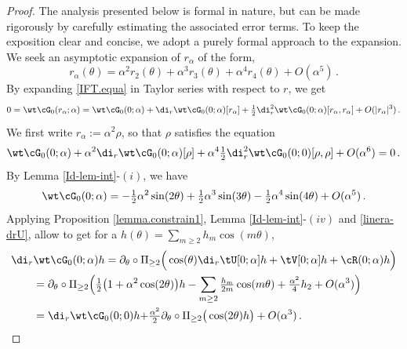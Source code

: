 \documentclass[a4paper,reqno,10pt]{article}
\newcommand{\pa}{\partial}
\begin{document}
\begin{proof}
    The analysis presented below is formal in nature, but can be made rigorously by carefully estimating the associated error terms. To keep the exposition clear and concise, we adopt a purely formal approach to the expansion. We seek an asymptotic expansion of \( r_\alpha \) of the form,
	\begin{equation}\label{ansatz.ralpha}
		r_\alpha(\theta) = \alpha^2 r_2(\theta)  + \alpha^3 r_3(\theta) + \alpha^4 r_4(\theta) + O(\alpha^5) \,.
	\end{equation}
	By expanding \eqref{IFT.equa} in Taylor series with respect to $r$, we get
	\begin{equation}
		0 = \wt\cG_{0}(r_\alpha;\alpha) = \wt\cG_{0}(0;\alpha) + \di_{r} \wt\cG_{0}(0;\alpha) [r_{\alpha}] + \tfrac12 \di_{r}^2 \wt\cG_{0}(0;\alpha) [r_\alpha,r_\alpha] + O(|r_\alpha|^3) \,.
	\end{equation}
    We first write $r_\alpha:=\alpha^2\rho$, so that $\rho$ satisfies the equation
    \begin{equation}\label{equa.for.rho1}
		 \wt\cG_{0}(0;\alpha) +\alpha^2 \di_{r} \wt\cG_{0}(0;\alpha) [\rho] +\alpha^4 \tfrac12 \di_{r}^2 \wt\cG_{0}(0;0) [\rho,\rho] + O(\alpha^6)=0 \,.
	\end{equation}
    By Lemma \ref{Id-lem-int}-$(i)$, we have
    	\begin{equation}
    		\wt\cG_{0}(0;\alpha) =- \tfrac12 \alpha^2 \sin(2\theta) + \tfrac12 \alpha^3 \sin(3\theta) - \tfrac12\alpha^4 \sin(4\theta) + O(\alpha^5) \,.
    	\end{equation}
    	Applying   Proposition \ref{lemma.constrain1}, Lemma \ref{Id-lem-int}-$(iv)$ and \eqref{linera-drU}, allow to get  for a $h(\theta)=\sum_{m\geq 2} h_m \cos(m\theta)$,
    		\begin{align}
    			\di_{r} &\wt\cG_{0}(0;\alpha) h  = \pa_{\theta} \circ \Pi_{\geq 2}\Big( \cos(\theta) \di_{r}\tU[0;\alpha]h+  \tV[0;\alpha]h +  \cR(0;\alpha) h  \Big) \\
    			& = \pa_{\theta} \circ \Pi_{\geq 2} \Big(    \tfrac12 \big(1+\alpha^2\cos(2\theta)\big)h - \sum_{m\geq 2} \tfrac{h_m}{2m}  \cos(m\theta) + \tfrac{\alpha^2}{4} h_2 + O(\alpha^3) \Big) \\
    			& = \di_{r}\wt\cG_{0}(0;0)h { + \tfrac{\alpha^2}{2}\pa_{\theta}\circ \Pi_{\geq 2}\big(\cos(2\theta)h\big) } + O(\alpha^3) \,.
    		\end{align}

\end{proof}
\end{document}

